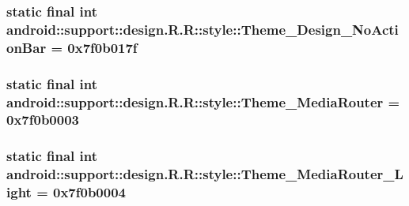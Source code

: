 \hypertarget{classandroid_1_1support_1_1design_1_1_r_1_1style_9d5d7a38eb7ca5832a1ea3840c390968}{
\subsubsection[{Theme\_\-Design\_\-NoActionBar}]{\setlength{\rightskip}{0pt plus 5cm}static final int android::support::design.R.R::style::Theme\_\-Design\_\-NoActionBar = 0x7f0b017f}}
\label{classandroid_1_1support_1_1design_1_1_r_1_1style_9d5d7a38eb7ca5832a1ea3840c390968}


\hypertarget{classandroid_1_1support_1_1design_1_1_r_1_1style_af9e55929350306e9bad1dbebdda4905}{
\subsubsection[{Theme\_\-MediaRouter}]{\setlength{\rightskip}{0pt plus 5cm}static final int android::support::design.R.R::style::Theme\_\-MediaRouter = 0x7f0b0003}}
\label{classandroid_1_1support_1_1design_1_1_r_1_1style_af9e55929350306e9bad1dbebdda4905}


\hypertarget{classandroid_1_1support_1_1design_1_1_r_1_1style_7625fffbda004e84d4126ea023fc28f4}{
\subsubsection[{Theme\_\-MediaRouter\_\-Light}]{\setlength{\rightskip}{0pt plus 5cm}static final int android::support::design.R.R::style::Theme\_\-MediaRouter\_\-Light = 0x7f0b0004}}
\label{classandroid_1_1support_1_1design_1_1_r_1_1style_7625fffbda004e84d4126ea023fc28f4}



